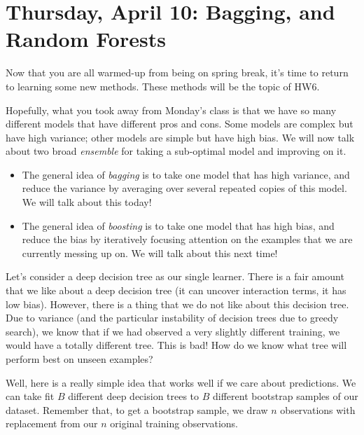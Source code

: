 \section{Thursday, April 10: Bagging, and Random Forests}

Now that you are all warmed-up from being on spring break, it's time to return to learning some new methods. These methods will be the topic of HW6.

Hopefully, what you took away from Monday's class is that we have so many different models that have different pros and cons. Some models are complex but have high variance; other models are simple but have high bias. We will now talk about two broad \emph{ensemble} for taking a sub-optimal model and improving on it. 
\begin{itemize}
\item The general idea of \emph{bagging} is to take one model that has high variance, and reduce the variance by averaging over several repeated copies of this model. We will talk about this today!
\item The general idea of \emph{boosting} is to take one model that has high bias, and reduce the bias by iteratively focusing attention on the examples that we are currently messing up on. 	We will talk about this next time!
\end{itemize}

Let's consider a deep decision tree as our single learner. There is a fair amount that we like about a deep decision tree (it can uncover interaction terms, it has low bias). However, there is a thing that we do not like about this decision tree. Due to variance (and the particular instability of decision trees due to greedy search), we know that if we had observed a very slightly different training, we would have a totally different tree. This is bad! How do we know what tree will perform best on unseen examples?

Well, here is a really simple idea that works well if we care about predictions. We can take fit $B$ different deep decision trees to $B$ different bootstrap samples of our dataset. Remember that, to get a bootstrap sample, we draw $n$ observations with replacement from our $n$ original training observations. 



